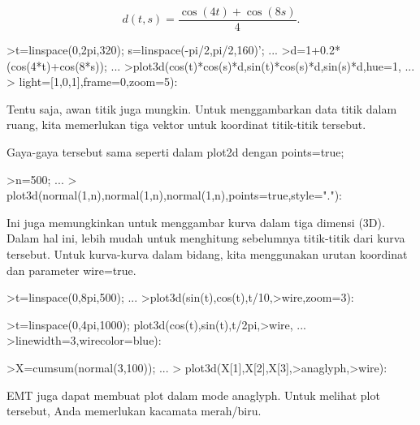\documentclass{article}
\begin{document}
\begin{eulernotebook}
\begin{eulercomment}
\end{eulercomment}
\begin{eulerformula}
\[
d(t,s) = \frac{\cos(4t)+\cos(8s)}{4}.
\]
\end{eulerformula}
\begin{eulerprompt}
>t=linspace(0,2pi,320); s=linspace(-pi/2,pi/2,160)'; ...
>d=1+0.2*(cos(4*t)+cos(8*s)); ...
>plot3d(cos(t)*cos(s)*d,sin(t)*cos(s)*d,sin(s)*d,hue=1, ...
>  light=[1,0,1],frame=0,zoom=5):
\end{eulerprompt}
\begin{eulercomment}
Tentu saja, awan titik juga mungkin. Untuk menggambarkan data titik
dalam ruang, kita memerlukan tiga vektor untuk koordinat titik-titik
tersebut.

Gaya-gaya tersebut sama seperti dalam plot2d dengan points=true;
\end{eulercomment}
\begin{eulerprompt}
>n=500;  ...
>  plot3d(normal(1,n),normal(1,n),normal(1,n),points=true,style="."):
\end{eulerprompt}
\begin{eulercomment}
Ini juga memungkinkan untuk menggambar kurva dalam tiga dimensi (3D).
Dalam hal ini, lebih mudah untuk menghitung sebelumnya titik-titik
dari kurva tersebut. Untuk kurva-kurva dalam bidang, kita menggunakan
urutan koordinat dan parameter wire=true.
\end{eulercomment}
\begin{eulerprompt}
>t=linspace(0,8pi,500); ...
>plot3d(sin(t),cos(t),t/10,>wire,zoom=3):
\end{eulerprompt}
\begin{eulerprompt}
>t=linspace(0,4pi,1000); plot3d(cos(t),sin(t),t/2pi,>wire, ...
>linewidth=3,wirecolor=blue):
\end{eulerprompt}
\begin{eulerprompt}
>X=cumsum(normal(3,100)); ...
> plot3d(X[1],X[2],X[3],>anaglyph,>wire):
\end{eulerprompt}
\begin{eulercomment}
EMT juga dapat membuat plot dalam mode anaglyph. Untuk melihat plot
tersebut, Anda memerlukan kacamata merah/biru.
\end{eulercomment}
\begin{eulerprompt}

\end{eulerprompt}
\end{eulernotebook}
\end{document}

